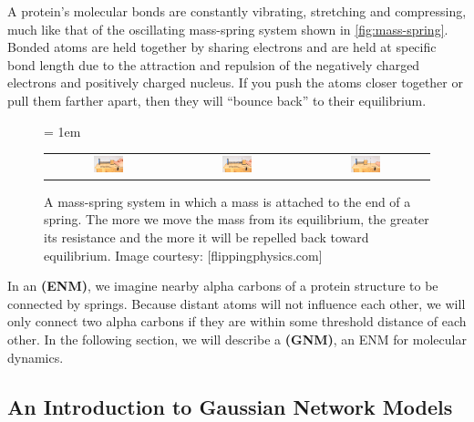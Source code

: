 A protein's molecular bonds are constantly vibrating, stretching and compressing, much like that of the oscillating mass-spring system shown in \autoref{fig:mass-spring}. Bonded atoms are held together by sharing electrons and are held at specific bond length due to the attraction and repulsion of the negatively charged electrons and positively charged nucleus. If you push the atoms closer together or pull them farther apart, then they will ``bounce back'' to their equilibrium.

\begin{figure}[h]
	\centering
	\tabcolsep = 1em
	\mySfFamily
	\begin{tabular}{c c c}
		\includegraphics[width = 0.25\textwidth]{../images/mass_spring1.png} & \includegraphics[width = 0.25\textwidth]{../images/mass_spring2.png} & \includegraphics[width = 0.25\textwidth]{../images/mass_spring3.png}
	\end{tabular}
	\caption{A mass-spring system in which a mass is attached to the end of a spring. The more we move the mass from its equilibrium, the greater its resistance and the more it will be repelled back toward equilibrium. Image courtesy: [flippingphysics.com]}
	\label{fig:mass-spring}
\end{figure}


In an  \textbf{(ENM)}, we imagine nearby alpha carbons of a protein structure to be connected by springs. Because distant atoms will not influence each other, we will only connect two alpha carbons if they are within some threshold distance of each other. In the following section, we will describe a  \textbf{(GNM)}, an ENM for molecular dynamics.

\FloatBarrier
{}
\subsection{An Introduction to Gaussian Network Models}

